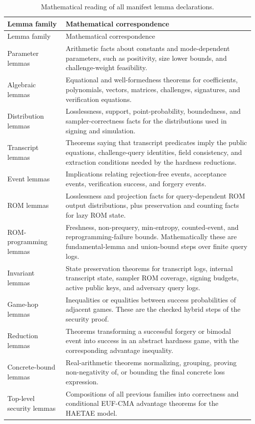 \begin{longtable}{p{}p{}}
\caption{Mathematical reading of all manifest lemma declarations.}
\label{tab:lemma-correspondence}\\
\toprule
Lemma family & Mathematical correspondence \\
\midrule
\endfirsthead
\toprule
Lemma family & Mathematical correspondence \\
\midrule
\endhead
Parameter lemmas &
Arithmetic facts about constants and mode-dependent parameters, such as
positivity, size lower bounds, and challenge-weight feasibility. \\
Algebraic lemmas &
Equational and well-formedness theorems for coefficients, polynomials, vectors,
matrices, challenges, signatures, and verification equations. \\
Distribution lemmas &
Losslessness, support, point-probability, boundedness, and sampler-correctness
facts for the distributions used in signing and simulation. \\
Transcript lemmas &
Theorems saying that transcript predicates imply the public equations,
challenge-query identities, field consistency, and extraction conditions needed
by the hardness reductions. \\
Event lemmas &
Implications relating rejection-free events, acceptance events, verification
success, and forgery events. \\
ROM lemmas &
Losslessness and projection facts for query-dependent ROM output distributions,
plus preservation and counting facts for lazy ROM state. \\
ROM-programming lemmas &
Freshness, non-prequery, min-entropy, counted-event, and reprogramming-failure
bounds.  Mathematically these are fundamental-lemma and union-bound steps over
finite query logs. \\
Invariant lemmas &
State preservation theorems for transcript logs, internal transcript state,
sampler ROM coverage, signing budgets, active public keys, and adversary query
logs. \\
Game-hop lemmas &
Inequalities or equalities between success probabilities of adjacent games.
These are the checked hybrid steps of the security proof. \\
Reduction lemmas &
Theorems transforming a successful forgery or bimodal event into success in an
abstract hardness game, with the corresponding advantage inequality. \\
Concrete-bound lemmas &
Real-arithmetic theorems normalizing, grouping, proving non-negativity of, or
bounding the final concrete loss expression. \\
Top-level security lemmas &
Compositions of all previous families into correctness and conditional EUF-CMA
advantage theorems for the HAETAE model. \\
\bottomrule
\end{longtable}

